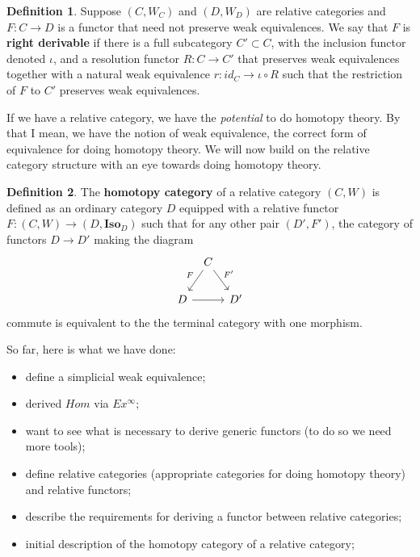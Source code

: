 \documentclass{article}
\theoremstyle{definition}
\newtheorem{defn}{Definition}[section]
\newcommand{\cat}[1]{\mathbf{#1}}
\begin{document}
\begin{defn}
Suppose $(C,W_{C})$ and $(D,W_{D})$ are relative categories and $F:C\rightarrow D$ is a functor that need not preserve weak equivalences. We say that $F$ is \textbf{right derivable} if there is a full subcategory $C'\subset C$, with the inclusion functor denoted $\iota$, and a resolution functor $R:C\rightarrow C'$ that preserves weak equivalences together with a natural weak equivalence $r:id_{C}\rightarrow \iota\circ R$ such that the restriction of $F$ to $C'$ preserves weak equivalences. 
\end{defn}

If we have a relative category, we have the \textit{potential} to do homotopy theory. By that I mean, we have the notion of weak equivalence, the correct form of equivalence for doing homotopy theory. We will now build on the relative category structure with an eye towards doing homotopy theory. 

\begin{defn}
The \textbf{homotopy category } of a relative category $(C,W)$ is defined as an ordinary category $D$ equipped with a relative functor $F:(C,W)\rightarrow (D,\cat{Iso}_{D})$ such that for any other pair $(D',F')$, the category of functors $D\rightarrow D'$ making the diagram 
\[
\begin{tikzcd}[column sep=tiny]
	&C\arrow[dl,"F"']\arrow[dr,"F'"]\\
D\arrow[rr]	&	&D'
\end{tikzcd}
\]
commute is equivalent to the the terminal category with one morphism. 
\end{defn}

So far, here is what we have done:

\begin{itemize}
\item define a simplicial weak equivalence;
\item derived $Hom$ via $Ex^{\infty}$;
\item want to see what is necessary to derive generic functors (to do so we need more tools);
\item define relative categories (appropriate categories for doing homotopy theory) and relative functors;
\item describe the requirements for deriving a functor between relative categories;
\item initial description of the homotopy category of a relative category;
\end{itemize}
\end{document}
